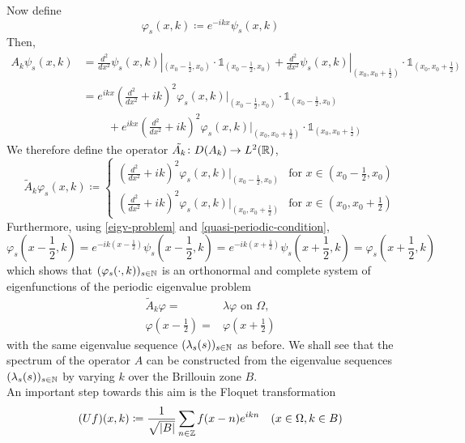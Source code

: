 	Now define
		\[ \varphi_{s}(x, k) \coloneqq e^{-ikx} \psi_{s}(x, k) \]
	Then,
		\begin{align*}
			A_{k} \psi_{s}(x, k) & = \frac{d^{2}}{dx^{2}} \psi_{s}(x, k)|_{(x_{0} - \frac{1}{2}, x_{0})} \cdot \mathds{1}_{(x_{0} - \frac{1}{2}, x_{0})} + \frac{d^{2}}{dx^{2}} \psi_{s}(x, k)|_{(x_{0}, x_{0}  + \frac{1}{2})} \cdot \mathds{1}_{(x_{0}, x_{0} + \frac{1}{2})} \\
				& = e^{ikx} \left( \frac{d^{2}}{dx^{2}} + ik \right)^{2} \varphi_{s}(x, k)|_{(x_{0} - \frac{1}{2}, x_{0})} \cdot \mathds{1}_{(x_{0} - \frac{1}{2}, x_{0})} \\
				& ~\qquad + e^{ikx} \left( \frac{d^{2}}{dx^{2}} + ik \right)^{2} \varphi_{s}(x, k)|_{(x_{0}, x_{0}  + \frac{1}{2})} \cdot \mathds{1}_{(x_{0}, x_{0} + \frac{1}{2})}
		\end{align*}
	We therefore define the operator $\tilde{A_{k}} \colon D(A_{k}) \rightarrow L^{2}(\mathbb{R})$, 
	\[ \tilde{A}_{k} \varphi_{s}(x, k) \coloneqq \begin{cases}
 		\left( \frac{d^{2}}{dx^{2}} + ik \right)^{2} \varphi_{s}(x, k)|_{(x_{0} - \frac{1}{2}, x_{0})} & \text{for } x \in (x_{0} - \frac{1}{2}, x_{0}) \\ \left( \frac{d^{2}}{dx^{2}} + ik \right)^{2} \varphi_{s}(x, k)|_{(x_{0}, x_{0}  + \frac{1}{2})} & \text{for } x \in (x_{0}, x_{0} + \frac{1}{2})
 	\end{cases} \] 
	Furthermore, using  \eqref{eigv-problem} and \eqref{quasi-periodic-condition},
		\[ \varphi_{s}(x - \frac{1}{2}, k) = e^{-ik(x - \frac{1}{2})} \psi_{s}(x - \frac{1}{2}, k) = e^{-ik(x + \frac{1}{2})} \psi_{s}(x + \frac{1}{2}, k) = \varphi_{s}(x + \frac{1}{2}, k) \]
	which shows that $(\varphi_{s}(\cdot, k))_{s \in \mathbb{N}}$ is an orthonormal and complete system of eigenfunctions of the periodic eigenvalue problem
	\begin{eqnarray}
		\tilde{A}_{k} \varphi = & \lambda
		 \varphi \text{ on } \Omega, \label{mod-eigv-problem} \\
		 \varphi(x - \frac{1}{2}) = & \varphi(x + \frac{1}{2}) \label{periodic-condition}
	\end{eqnarray}
	with the same eigenvalue sequence $(\lambda_{s}(s))_{s \in \mathbb{N}}$ as before. We shall see that the spectrum of the operator $A$ can be constructed from the eigenvalue sequences $(\lambda_{s}(s))_{s \in \mathbb{N}}$ by varying $k$ over the Brillouin zone $B$.\\
	
	An important step towards this aim is the Floquet transformation
		\begin{equation}
			(Uf)(x, k) \coloneqq \frac{1}{\sqrt{|B|}} \sum_{n \in \mathbb{Z}} f(x - n) e^{ikn} \quad (x \in \Omega, k \in B) \label{floquet-transformation}
		\end{equation}
		

